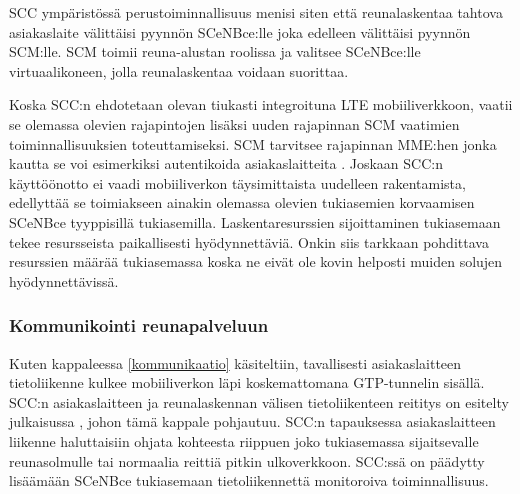 SCC ympäristössä perustoiminnallisuus menisi siten että reunalaskentaa tahtova asiakaslaite välittäisi pyynnön SCeNBce:lle joka edelleen välittäisi pyynnön SCM:lle.
SCM toimii reuna-alustan roolissa ja valitsee SCeNBce:lle virtuaalikoneen, jolla reunalaskentaa voidaan suorittaa. \cite{dolezal2016performance}


Koska SCC:n ehdotetaan olevan tiukasti integroituna LTE mobiiliverkkoon, vaatii se olemassa olevien rajapintojen lisäksi uuden rajapinnan SCM vaatimien toiminnallisuuksien toteuttamiseksi. SCM tarvitsee rajapinnan MME:hen jonka kautta se voi esimerkiksi autentikoida asiakaslaitteita \cite{lobillo15scc}. 
Joskaan SCC:n käyttöönotto ei vaadi mobiiliverkon täysimittaista uudelleen rakentamista, edellyttää se toimiakseen ainakin olemassa olevien tukiasemien korvaamisen SCeNBce tyyppisillä tukiasemilla. 
Laskentaresurssien sijoittaminen tukiasemaan tekee resursseista paikallisesti hyödynnettäviä. Onkin siis tarkkaan pohdittava resurssien määrää tukiasemassa koska ne eivät ole kovin helposti muiden solujen hyödynnettävissä.

 
%

\subsubsection*{Kommunikointi reunapalveluun} \label{GTP}
Kuten kappaleessa \ref{kommunikaatio} käsiteltiin, tavallisesti asiakaslaitteen tietoliikenne kulkee mobiiliverkon läpi koskemattomana GTP-tunnelin sisällä. 
SCC:n asiakaslaitteen ja reunalaskennan välisen tietoliikenteen reititys on esitelty julkaisussa \cite{puente15seamless}, johon tämä kappale pohjautuu.
SCC:n tapauksessa asiakaslaitteen liikenne haluttaisiin ohjata kohteesta riippuen joko tukiasemassa sijaitsevalle reunasolmulle tai normaalia reittiä pitkin ulkoverkkoon.
SCC:ssä on päädytty lisäämään SCeNBce tukiasemaan tietoliikennettä monitoroiva toiminnallisuus.

